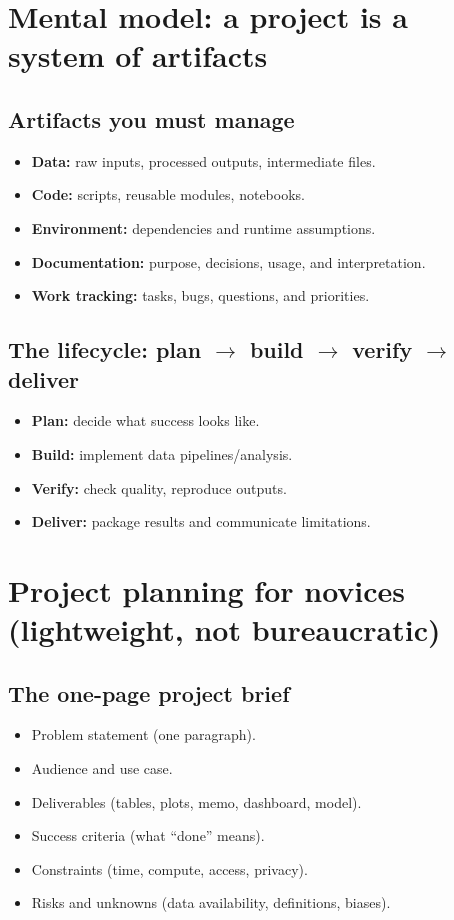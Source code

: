 \section{Mental model: a project is a system of artifacts}
\subsection{Artifacts you must manage}
\begin{itemize}
\item \textbf{Data:} raw inputs, processed outputs, intermediate files.
\item \textbf{Code:} scripts, reusable modules, notebooks.
\item \textbf{Environment:} dependencies and runtime assumptions.
\item \textbf{Documentation:} purpose, decisions, usage, and interpretation.
\item \textbf{Work tracking:} tasks, bugs, questions, and priorities.
\end{itemize}

\subsection{The lifecycle: plan $\rightarrow$ build $\rightarrow$ verify $\rightarrow$ deliver}
\begin{itemize}
\item \textbf{Plan:} decide what success looks like.
\item \textbf{Build:} implement data pipelines/analysis.
\item \textbf{Verify:} check quality, reproduce outputs.
\item \textbf{Deliver:} package results and communicate limitations.
\end{itemize}

\section{Project planning for novices (lightweight, not bureaucratic)}
\subsection{The one-page project brief}
\begin{itemize}
\item Problem statement (one paragraph).
\item Audience and use case.
\item Deliverables (tables, plots, memo, dashboard, model).
\item Success criteria (what ``done'' means).
\item Constraints (time, compute, access, privacy).
\item Risks and unknowns (data availability, definitions, biases).
\end{itemize}

